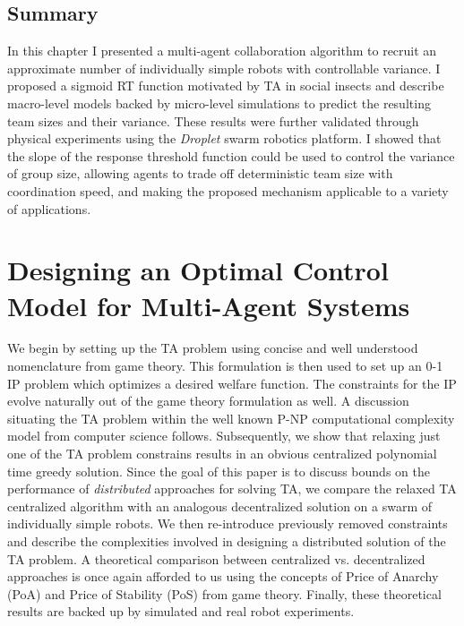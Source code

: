 \documentclass[defaultstyle,12pt]{thesis}
\begin{document}
\section{Summary}
In this chapter I presented a multi-agent collaboration algorithm to recruit an approximate number of individually simple robots with controllable variance. I proposed a sigmoid RT function motivated by TA in social insects and describe macro-level models backed by micro-level simulations to predict the resulting team sizes and their variance.  These results were further validated through physical experiments using the \emph{Droplet} swarm robotics platform. I showed that the slope of the response threshold function could be used to control the variance of group size, allowing agents to trade off deterministic team size with coordination speed, and making the proposed mechanism applicable to a variety of applications.


\chapter{Designing an Optimal Control Model for Multi-Agent Systems}\label{ch:optimization}
We begin by setting up the TA problem using concise and well understood nomenclature from game theory. This formulation is then used to set up an 0-1 IP problem which optimizes a desired welfare function. The constraints for the IP evolve naturally out of the game theory formulation as well. A discussion situating the TA problem within the well known P-NP computational complexity model from computer science follows. Subsequently, we show that relaxing just one of the TA problem constrains results in an obvious centralized polynomial time greedy solution. Since the goal of this paper is to discuss bounds on the performance of \emph{distributed} approaches for solving TA, we compare the relaxed TA centralized algorithm with an analogous decentralized solution on a swarm of individually simple robots. We then re-introduce previously removed constraints and describe the complexities involved in designing a distributed solution of the TA problem. A theoretical comparison between centralized vs. decentralized approaches is once again afforded to us using the concepts of Price of Anarchy (PoA) and Price of Stability (PoS) from game theory. Finally, these theoretical results are backed up by simulated and real robot experiments.


\end{document}
